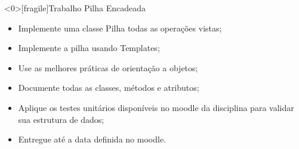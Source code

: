 \documentclass[12pt,table,xcolor={dvipsnames}]{beamer}
\begin{document}
\begin{frame}<0>[fragile]{Trabalho Pilha Encadeada}
\begin{itemize}
\item Implemente uma classe Pilha todas as operações vistas;
\item Implemente a pilha usando Templates;
\item Use as melhores práticas de orientação a objetos;
\item Documente todas as classes, métodos e atributos;
\item Aplique os testes unitários disponíveis no moodle da disciplina para validar sua estrutura de dados;
\item Entregue até a data definida no moodle.
\end{itemize}
\end{frame}
\end{document}
